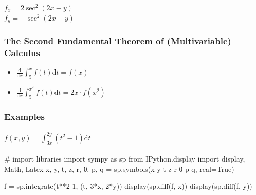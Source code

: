 \documentclass[
  letterpaper,
  DIV=11,
  numbers=noendperiod]{scrartcl}
\let\oldparagraph\paragraph
\renewcommand{\paragraph}[1]{\oldparagraph{#1}\mbox{}}
\newenvironment{Shaded}{\begin{snugshade}}{\end{snugshade}}
\newcommand{\CommentTok}[1]{\textcolor[rgb]{0.37,0.37,0.37}{#1}}
\newcommand{\DecValTok}[1]{\textcolor[rgb]{0.68,0.00,0.00}{#1}}
\newcommand{\ImportTok}[1]{\textcolor[rgb]{0.00,0.46,0.62}{#1}}
\newcommand{\NormalTok}[1]{\textcolor[rgb]{0.00,0.23,0.31}{#1}}
\newcommand{\OperatorTok}[1]{\textcolor[rgb]{0.37,0.37,0.37}{#1}}
\newcommand{\StringTok}[1]{\textcolor[rgb]{0.13,0.47,0.30}{#1}}
\newcommand{\VariableTok}[1]{\textcolor[rgb]{0.07,0.07,0.07}{#1}}
\providecommand{\tightlist}{%
  \setlength{\itemsep}{0pt}\setlength{\parskip}{0pt}}\usepackage{longtable,booktabs,array}
\begin{document}
\(f_x = 2\sec^2(2x-y)\)\\
\(f_y = -\sec^2(2x-y)\)

\subsubsection{The Second Fundamental Theorem of (Multivariable)
Calculus}\label{the-second-fundamental-theorem-of-multivariable-calculus}

\begin{itemize}
\tightlist
\item
  \(\frac{\mathrm{d}}{\mathrm{d}x}\int_5^x f(t) \mathrm{d}t = f(x)\)
\item
  \(\frac{\mathrm{d}}{\mathrm{d}x}\int_5^{x^2} f(t) \mathrm{d}t = 2x \cdot f(x^2)\)
\end{itemize}

\subsubsection{Examples}\label{examples-5}

\paragraph{\texorpdfstring{\(f(x,y) = \int_{3x}^{2y}(t^2-1)\mathrm{d}t\)}{f(x,y) = \textbackslash int\_\{3x\}\^{}\{2y\}(t\^{}2-1)\textbackslash mathrm\{d\}t}}\label{fxy-int_3x2yt2-1mathrmdt}

\begin{Shaded}
\begin{Highlighting}[numbers=left,,]
\CommentTok{\# import libraries}
\ImportTok{import}\NormalTok{ sympy }\ImportTok{as}\NormalTok{ sp}
\ImportTok{from}\NormalTok{ IPython.display }\ImportTok{import}\NormalTok{ display, Math, Latex}
\NormalTok{x, y, t, z, r, θ, p, q }\OperatorTok{=}\NormalTok{ sp.symbols(}\StringTok{\textquotesingle{}x y t z r θ p q\textquotesingle{}}\NormalTok{, real}\OperatorTok{=}\VariableTok{True}\NormalTok{)}
\end{Highlighting}
\end{Shaded}

\begin{Shaded}
\begin{Highlighting}[numbers=left,,]
\NormalTok{f }\OperatorTok{=}\NormalTok{ sp.integrate(t}\OperatorTok{**}\DecValTok{2}\OperatorTok{{-}}\DecValTok{1}\NormalTok{, (t, }\DecValTok{3}\OperatorTok{*}\NormalTok{x, }\DecValTok{2}\OperatorTok{*}\NormalTok{y))}
\NormalTok{display(sp.diff(f, x))}
\NormalTok{display(sp.diff(f, y))}
\end{Highlighting}
\end{Shaded}
\end{document}
